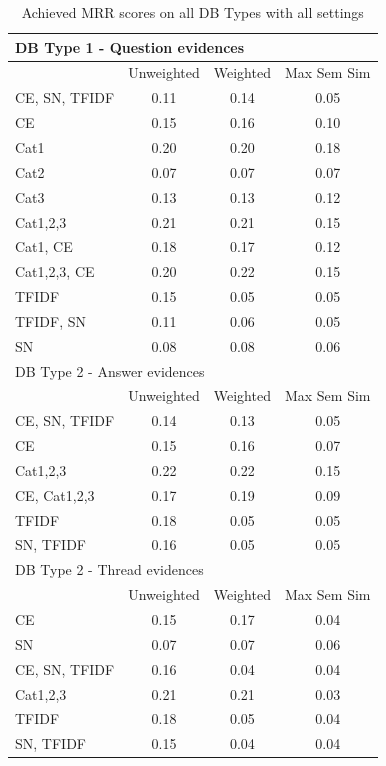 \documentclass[conference]{IEEEtran}
\begin{document}
	
\begin{table}[!h]
	\centering
	\renewcommand{\arraystretch}{1.3}
	\caption{Achieved MRR scores on all DB Types with all settings}
	\label{tab:resultsmrr}
	\begin{tabular}{l||ccc}\hline
	
		\multicolumn{4}{l}{DB Type 1 - Question evidences}\\\hline\hline
		& Unweighted & Weighted & Max Sem Sim\\
		CE, SN, TFIDF & 0.11 & 0.14 & 0.05\\
		CE & 0.15 & 0.16 & 0.10\\
		Cat1 & 0.20 & 0.20 & 0.18\\
		Cat2 & 0.07 & 0.07 & 0.07\\
		Cat3 & 0.13 & 0.13 & 0.12\\
		Cat1,2,3 & 0.21 & 0.21 & 0.15\\
		Cat1, CE & 0.18 & 0.17 & 0.12\\
		Cat1,2,3, CE & 0.20 & 0.22 & 0.15\\
		TFIDF & 0.15 & 0.05 & 0.05\\
		TFIDF, SN & 0.11 & 0.06 & 0.05\\
		SN & 0.08 & 0.08 & 0.06\\
		\hline
		
		\multicolumn{4}{l}{DB Type 2 - Answer evidences}\\\hline\hline
		& Unweighted & Weighted & Max Sem Sim\\
		CE, SN, TFIDF & 0.14 & 0.13 & 0.05\\
		CE & 0.15 & 0.16 & 0.07\\
		Cat1,2,3 & 0.22 & 0.22 & 0.15\\
		CE, Cat1,2,3 & 0.17 & 0.19 & 0.09\\
		TFIDF & 0.18 & 0.05 & 0.05\\
		SN, TFIDF & 0.16 & 0.05 & 0.05\\
		\hline
		
		\multicolumn{4}{l}{DB Type 2 - Thread evidences}\\\hline\hline
		& Unweighted & Weighted & Max Sem Sim\\
		CE & 0.15 & 0.17 & 0.04\\
		SN & 0.07 & 0.07 & 0.06\\
		CE, SN, TFIDF & 0.16 & 0.04 & 0.04\\
		Cat1,2,3 & 0.21 & 0.21 & 0.03\\
		TFIDF & 0.18 & 0.05 & 0.04\\
		SN, TFIDF & 0.15 & 0.04 & 0.04\\
		\hline
		

\end{tabular}
\end{table}
\end{document}
